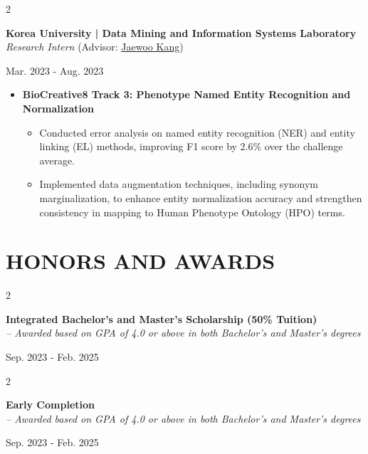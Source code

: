\documentclass[10pt, letterpaper]{article}
\newenvironment{highlights}{
    \begin{itemize}[
        topsep=0.10 cm,
        parsep=0.10 cm,
        partopsep=0pt,
        itemsep=0pt,
        leftmargin=0 cm + 10pt
    ]
}{
    \end{itemize}
} %
\newenvironment{twocolentry}[2][]{
    \onecolentry
    \def\secondColumn{#2}
    \setcolumnwidth{\fill, 3.5 cm}
    \begin{paracol}{2}
}{
    \switchcolumn \raggedleft \secondColumn
    \end{paracol}
    \endonecolentry
} %
\begin{document}
         \vspace{0.15 cm}       
        \begin{twocolentry}{
            Mar. 2023 - Aug. 2023\\ 
        }
        \textbf{Korea University | Data Mining and Information Systems Laboratory} \\
        \textit{Research Intern} (Advisor: \href{https://scholar.google.co.kr/citations?user=RaBZafQAAAAJ&hl=ko}{Jaewoo Kang})
        \end{twocolentry}
        \vspace{0.1 cm}
\begin{highlights}
    \item \textbf{BioCreative8 Track 3: Phenotype Named Entity Recognition and Normalization}
    \vspace{-0.1 cm}
    \begin{highlights}
    \item Conducted error analysis on named entity recognition (NER) and entity linking (EL) methods, improving F1 score by 2.6\% over the challenge average.
    \item Implemented data augmentation techniques, including synonym marginalization, to enhance entity normalization accuracy and strengthen consistency in mapping to Human Phenotype Ontology (HPO) terms.
    \end{highlights}
\end{highlights}
            \vspace{0.05 cm}
\section{HONORS AND AWARDS}
            \vspace{0.05 cm}
        \begin{twocolentry}
        {
            Sep. 2023 - Feb. 2025
        }
        {
        \textbf{Integrated Bachelor's and Master's Scholarship (50\% Tuition)}\\
        \textit{– Awarded based on GPA of 4.0 or above in both Bachelor’s and Master’s degrees
}
        }
        \end{twocolentry}

    \vspace{0.1 cm}
        \begin{twocolentry}
        {
            Sep. 2023 - Feb. 2025
        }
        {
        \textbf{Early Completion} \\
        \textit{– Awarded based on GPA of 4.0 or above in both Bachelor’s and Master’s degrees
}
        }
        \end{twocolentry}
\end{document}
